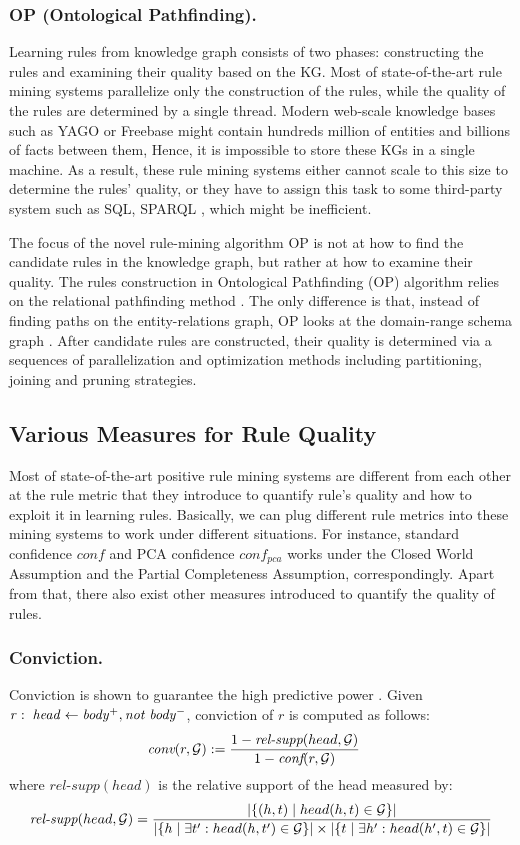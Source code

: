 \subsubsection{OP (Ontological Pathfinding).} 
Learning rules from knowledge graph consists of two phases: constructing the rules and examining their quality based on the KG. Most of state-of-the-art rule mining systems parallelize only the construction of the rules, while the quality of the rules are determined by a single thread.
Modern web-scale knowledge bases such as YAGO or Freebase might contain hundreds million of entities and billions of facts between them, Hence, it is impossible to store these KGs in a single machine. As a result, these rule mining systems either cannot scale to this size to determine the rules' quality, or they have to assign this task to some third-party system such as SQL, SPARQL \cite{amie}, which might be inefficient.

The focus of the novel rule-mining algorithm OP\cite{op} is not at how to find the candidate rules in the knowledge graph, but rather at how to examine their quality. The rules construction in Ontological Pathfinding (OP) algorithm relies on the relational pathfinding method \cite{DBLP:conf/aaai/RichardsM92}. The only difference is that, instead of finding paths on the entity-relations graph, OP looks at the domain-range schema graph \cite{op}. After candidate rules are constructed, their quality is determined via a sequences of parallelization and optimization methods including partitioning, joining and pruning strategies. 
\subsection{Various Measures for Rule Quality}
Most of state-of-the-art positive rule mining systems are different from each other at the rule metric that they introduce to quantify rule's quality and how to exploit it in learning rules. Basically, we can plug different rule metrics into these mining systems to work under different situations. For instance, standard confidence $conf$ and PCA confidence $conf_{pca}$ works under the Closed World Assumption and the Partial Completeness Assumption, correspondingly. Apart from that, there also exist other measures introduced to quantify the quality of rules.

\subsubsection{Conviction.} Conviction is shown to guarantee the high predictive power \cite{Azevedo2007}. Given $\mathit{r:\; head\leftarrow body^+, not\;  body^-}$, conviction of $r$ is computed as follows:
\begin{align*}
\textit{conv}(r,\mathcal{G}) & := \frac{1 - \textit{rel-supp}(head, \mathcal{G})}{1-\textit{conf}(r,\mathcal{G})}
\end{align*}
where $\textit{rel-supp}(head)$ is the relative support of the head measured by:
\begin{align*}
\textit{rel-supp}(head, \mathcal{G}) = \frac{|\{(h, t) \mid head(h,t) \in \mathcal{G}\}|}{|\{h \mid \exists t':head(h,t') \in \mathcal{G}\}| \times |\{t \mid \exists h': head(h',t) \in \mathcal{G}\}|}
\end{align*}
